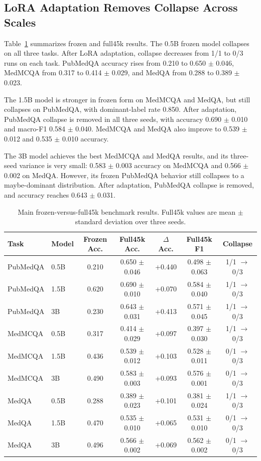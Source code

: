 \documentclass[11pt]{article}
\begin{document}
\subsection{LoRA Adaptation Removes Collapse Across Scales}

Table~\ref{tab:main_results} summarizes frozen and full45k results. The 0.5B frozen model collapses on all three tasks. After LoRA adaptation, collapse decreases from 1/1 to 0/3 runs on each task. PubMedQA accuracy rises from 0.210 to 0.650 $\pm$ 0.046, MedMCQA from 0.317 to 0.414 $\pm$ 0.029, and MedQA from 0.288 to 0.389 $\pm$ 0.023.

The 1.5B model is stronger in frozen form on MedMCQA and MedQA, but still collapses on PubMedQA, with dominant-label rate 0.850. After adaptation, PubMedQA collapse is removed in all three seeds, with accuracy 0.690 $\pm$ 0.010 and macro-F1 0.584 $\pm$ 0.040. MedMCQA and MedQA also improve to 0.539 $\pm$ 0.012 and 0.535 $\pm$ 0.010 accuracy.

The 3B model achieves the best MedMCQA and MedQA results, and its three-seed variance is very small: 0.583 $\pm$ 0.003 accuracy on MedMCQA and 0.566 $\pm$ 0.002 on MedQA. However, its frozen PubMedQA behavior still collapses to a maybe-dominant distribution. After adaptation, PubMedQA collapse is removed, and accuracy reaches 0.643 $\pm$ 0.031.

\begin{table}[t]
\centering
\scriptsize
\setlength{\tabcolsep}{3.4pt}
\caption{Main frozen-versus-full45k benchmark results. Full45k values are mean $\pm$ standard deviation over three seeds.}
\label{tab:main_results}
\begin{tabular}{llccccc}
\toprule
Task & Model & Frozen Acc. & Full45k Acc. & $\Delta$ Acc. & Full45k F1 & Collapse \\
\midrule
PubMedQA & 0.5B & 0.210 & 0.650 $\pm$ 0.046 & +0.440 & 0.498 $\pm$ 0.063 & 1/1 $\rightarrow$ 0/3 \\
PubMedQA & 1.5B & 0.620 & 0.690 $\pm$ 0.010 & +0.070 & 0.584 $\pm$ 0.040 & 1/1 $\rightarrow$ 0/3 \\
PubMedQA & 3B & 0.230 & 0.643 $\pm$ 0.031 & +0.413 & 0.571 $\pm$ 0.045 & 1/1 $\rightarrow$ 0/3 \\
MedMCQA & 0.5B & 0.317 & 0.414 $\pm$ 0.029 & +0.097 & 0.397 $\pm$ 0.030 & 1/1 $\rightarrow$ 0/3 \\
MedMCQA & 1.5B & 0.436 & 0.539 $\pm$ 0.012 & +0.103 & 0.528 $\pm$ 0.011 & 0/1 $\rightarrow$ 0/3 \\
MedMCQA & 3B & 0.490 & 0.583 $\pm$ 0.003 & +0.093 & 0.576 $\pm$ 0.001 & 0/1 $\rightarrow$ 0/3 \\
MedQA & 0.5B & 0.288 & 0.389 $\pm$ 0.023 & +0.101 & 0.381 $\pm$ 0.024 & 1/1 $\rightarrow$ 0/3 \\
MedQA & 1.5B & 0.470 & 0.535 $\pm$ 0.010 & +0.065 & 0.531 $\pm$ 0.010 & 0/1 $\rightarrow$ 0/3 \\
MedQA & 3B & 0.496 & 0.566 $\pm$ 0.002 & +0.069 & 0.562 $\pm$ 0.002 & 0/1 $\rightarrow$ 0/3 \\
\bottomrule
\end{tabular}
\end{table}
\end{document}
